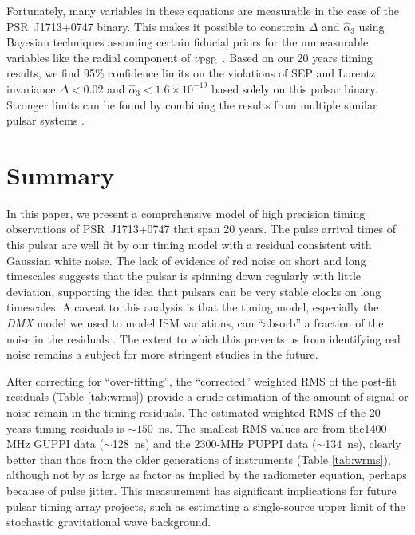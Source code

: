 Fortunately, many variables in these equations are measurable in the
case of the PSR~J1713+0747 binary. This makes it possible to constrain $\Delta$
and $\hat{\alpha}_3$ using Bayesian techniques assuming certain fiducial
priors for the unmeasurable variables like the radial component of
$v_{\rm PSR}$ \citep{sns+05, sfl+05, gsf+11}. Based on our 20 years 
timing results, we find 95\% confidence limits on the violations of SEP and
Lorentz invariance $\Delta < 0.02$ and
$\hat{\alpha}_3<1.6\times10^{-19}$ based solely on this pulsar
binary.  Stronger limits can be found by combining the results from
multiple similar pulsar systems \citep{wex00,sfl+05, gsf+11}.


\section{Summary}
In this paper, we present a comprehensive model of high precision timing observations of
PSR~J1713+0747 that span 20 years. 
The pulse arrival times of this pulsar are well fit by our timing model with a
residual consistent with Gaussian white noise.
The lack of evidence of red noise on short and long timescales suggests that
the pulsar is spinning down regularly with little deviation, supporting the
idea that pulsars can be very stable clocks on long timescales.
A caveat to this analysis is that the timing model, especially the
\textit{DMX} model we used to model ISM variations, can ``absorb'' a fraction
of the noise in the residuals \citep{kcs+13}. The extent to which this prevents us from
identifying red noise remains a subject for more stringent studies in the
future.

After correcting for ``over-fitting'', the ``corrected'' weighted RMS of the post-fit residuals (Table \ref{tab:wrms}) provide a crude estimation of
the amount of signal or noise remain in the timing residuals. The estimated
weighted RMS of the 20 years timing residuals is $\sim 150$~ns. The smallest
RMS values are from the1400-MHz GUPPI data ($\sim$128~ns) and the
2300-MHz PUPPI data ($\sim$134~ns),
clearly better than thos from the older generations of instruments 
(Table \ref{tab:wrms}), although not by as large as factor as implied
by the radiometer equation, perhaps because of pulse jitter. 
This measurement has significant implications for future pulsar timing array
projects, such as estimating a single-source
upper limit of the stochastic gravitational wave background.


